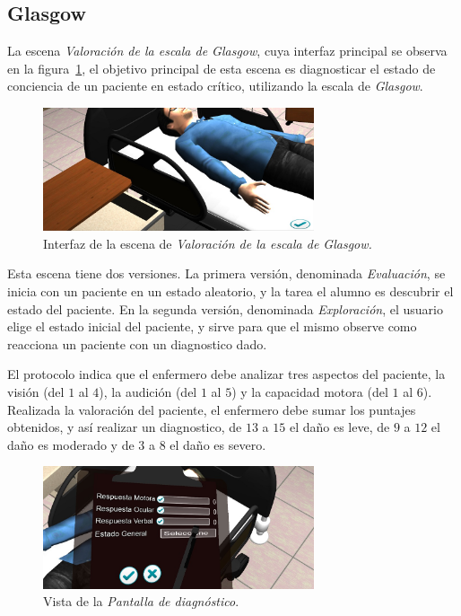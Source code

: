 \subsection{Glasgow}

La escena \emph{Valoración de la escala de Glasgow}, cuya interfaz principal se
observa en la figura~\ref{fig:glasgow_principal}, el objetivo principal de esta
escena es diagnosticar el estado de conciencia de un paciente en estado crítico,
utilizando la escala de \textit{Glasgow}\cite{protocolo}. 

\begin{figure}[H]
\centering
\includegraphics[width=8cm]{../solucion/images/glasgow_principal.jpg}
\caption{Interfaz de la escena de \emph{Valoración de la escala de Glasgow.}}
\label{fig:glasgow_principal}
\end{figure}

Esta escena tiene dos versiones. La primera versión, denominada
\emph{Evaluación}, se inicia con un paciente en un estado aleatorio, y la tarea
el alumno es descubrir el estado del paciente. En la segunda versión, denominada
\emph{Exploración}, el usuario elige el estado inicial del paciente, y sirve
para que el mismo observe como reacciona un paciente con un diagnostico dado.

El protocolo indica que el enfermero debe analizar tres aspectos del paciente,
la visión (del $1$ al $4$), la audición (del $1$ al $5$) y la capacidad motora
(del $1$ al $6$)\cite{protocolo}. Realizada la valoración del
paciente, el enfermero debe sumar los puntajes obtenidos, y así realizar un
diagnostico, de $13$ a $15$ el daño es leve, de $9$ a $12$ el daño es moderado y
de $3$ a $8$ el daño es severo\cite{helmick2007mild}.


\begin{figure}
\centering
\includegraphics[width=8cm]{../solucion/images/glasgow_diagnostico.jpg}
\caption{Vista de la \emph{Pantalla de diagnóstico}.}
\label{fig:glasgow_gui_resultados}
\end{figure}

